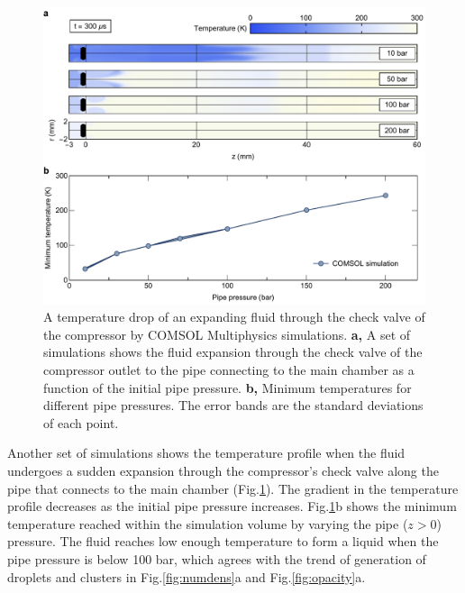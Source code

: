 \begin{figure}[t!]
\centering
\includegraphics[width=130mm]{figures/ch2/comsol/comsolCompressor.pdf}
\caption{A temperature drop of an expanding fluid through the check valve of the compressor by COMSOL Multiphysics simulations. \textbf{a,} A set of simulations shows the fluid expansion through the check valve of the compressor outlet to the pipe connecting to the main chamber as a function of the initial pipe pressure. \textbf{b,} Minimum temperatures for different pipe pressures. The error bands are the standard deviations of each point.}
\label{fig:comsolCompressor}
\end{figure}

Another set of simulations shows the temperature profile when the fluid undergoes a sudden expansion through the compressor’s check valve along the pipe that connects to the main chamber (Fig.\ref{fig:comsolCompressor}). The gradient in the temperature profile decreases as the initial pipe pressure increases. Fig.\ref{fig:comsolCompressor}b shows the minimum temperature reached within the simulation volume by varying the pipe ($z>0$) pressure. The fluid reaches low enough temperature to form a liquid when the pipe pressure is below 100 bar, which agrees with the trend of generation of droplets and clusters in Fig.\ref{fig:numdens}a and Fig.\ref{fig:opacity}a.

